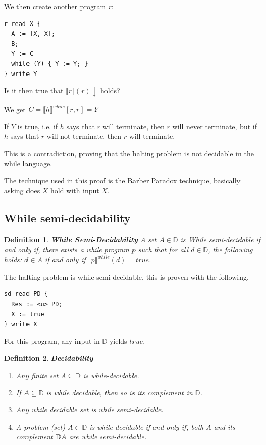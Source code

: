\documentclass[a4paper, final]{article}
\newtheorem{definition}{Definition}
\begin{document}
We then create another program $r$:

\begin{lstlisting}
r read X {
  A := [X, X];
  B;
  Y := C
  while (Y) { Y := Y; }
} write Y
\end{lstlisting}

Is it then true that $\llbracket r \rrbracket(r)\downarrow$ holds?

We get $C=\llbracket h \rrbracket^{while}[r,r] = Y$

If $Y$ is true, i.e. if $h$ says that $r$ will terminate, then $r$ will never terminate,
but if $h$ says that $r$ will not terminate, then $r$ will terminate.

This is a contradiction, proving that the halting problem is not decidable
in the while language.

The technique used in this proof is the Barber Paradox technique, basically asking does $X$ hold with input $X$.

\subsection{While semi-decidability}
\begin{definition}
	\textbf{While Semi-Decidability}
	A set $A\in\mathbb{D}$ is While semi-decidable if and only if, there exists a while program $p$ such that for all
	$d\in\mathbb{D}$, the following holds: $d\in A$ if and only if $\llbracket p \rrbracket^{while}(d) = true$.
\end{definition}

The halting problem is while semi-decidable, this is proven with the following.
\begin{lstlisting}
sd read PD {
  Res := <u> PD;
  X := true
} write X
\end{lstlisting}

For this program, any input in $\mathbb{D}$ yields $true$.

\begin{definition}
	\textbf{Decidability}
	\begin{enumerate}
		\item Any finite set $A\subseteq\mathbb{D}$ is while-decidable.
		\item If $A\subseteq\mathbb{D}$ is while decidable, then so is its complement in $\mathbb{D}$.
		\item Any while decidable set is while semi-decidable.
		\item A problem (set) $A\in\mathbb{D}$ is while decidable if and only if, both $A$ and its complement
		      $\mathbb{D}\\A$ are while semi-decidable.
	\end{enumerate}
\end{definition}
\end{document}
